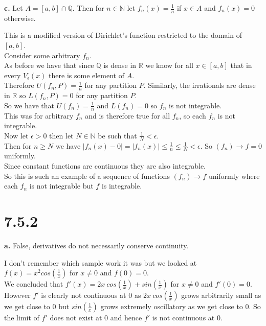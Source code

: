 \documentclass{article}
\begin{document}
{\Large\textbf{c.}} Let $A = [a, b]\cap\mathbb{Q}$. Then for $n\in\mathbb{N}$ let $f_n (x) =\frac{1}{n}$ if $x\in A$ and $f_n (x) = 0$ otherwise.
\begin{center}
    \doublespacing
    This is a modified version of Dirichlet's function restricted to the domain of $[a, b]$.
    \\Consider some arbitrary $f_n$.
    \\As before we have that since $\mathbb{Q}$ is dense in $\mathbb{R}$ we know for all $x\in [a, b]$ that in every $V_{\epsilon} (x)$ there is some element of $A$.
    \\Therefore $U(f_n, P) =\frac{1}{n}$ for any partition $P$. Similarly, the irrationals are dense in $\mathbb{R}$ so $L(f_n, P) = 0$ for any partition $P$.
    \\So we have that $U(f_n) =\frac{1}{n}$ and $L(f_n) = 0$ so $f_n$ is not integrable.
    \\This was for arbitrary $f_n$ and is therefore true for all $f_n$, so each $f_n$ is not integrable.
    \\Now let $\epsilon > 0$ then let $N\in\mathbb{N}$ be such that $\frac{1}{N} <\epsilon$.
    \\Then for $n\geq N$ we have $|f_n (x) - 0| = |f_n (x)|\leq\frac{1}{n}\leq\frac{1}{N} <\epsilon$. So $(f_n)\rightarrow f = 0$ uniformly.
    \\Since constant functions are continuous they are also integrable.
    \\So this is such an example of a sequence of functions $(f_n)\rightarrow f$ uniformly where each $f_n$ is not integrable but $f$ is integrable.
\end{center}


\newpage
\section*{7.5.2}

{\Large\textbf{a.}} False, derivatives do not necessarily conserve continuity.
\begin{center}
    \doublespacing
    I don't remember which sample work it was but we looked at $f(x) = x^2 cos(\frac{1}{x})$ for $x\neq 0$ and $f(0) = 0$.
    \\We concluded that $f'(x) = 2x\:cos(\frac{1}{x}) + sin(\frac{1}{x})$ for $x\neq 0$ and $f' (0) = 0$.
    \\However $f'$ is clearly not continuous at 0 as $2x\:cos(\frac{1}{x})$ grows arbitrarily small as we get close to 0 but $sin(\frac{1}{x})$ grows extremely oscillatory as we get close to 0. So the limit of $f'$ does not exist at 0 and hence $f'$ is not continuous at 0.
\end{center}
\end{document}
